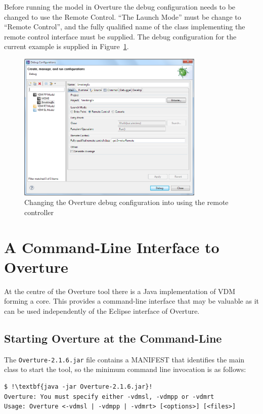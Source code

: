\documentclass{overturerepchap}
\begin{document}
Before running the model in Overture the debug configuration needs to be changed to use the Remote Control. ``The Launch Mode'' must be change to ``Remote Control'', and the fully qualified name of the class implementing the remote control interface must be supplied. The debug configuration for the current example is supplied in Figure~\ref{fig:gui:DebugConfiguration}.

\begin{figure}[h]
\begin{center}
  \includegraphics[width=3.5in]{figures/SmokersDebugConfig}
  \caption[labelInTOC]{Changing the Overture debug configuration into using the remote controller}
  \label{fig:gui:DebugConfiguration}
\end{center}
\end{figure}



\chapter{A Command-Line Interface to Overture}\label{sec:commandline}

At the centre of the Overture tool there is a Java implementation of VDM
forming a core. This provides a command-line interface that may be valuable
as it can be used independently of the Eclipse interface of Overture.

\section{Starting Overture at the Command-Line}

The \texttt{Overture-2.1.6.jar} file contains a MANIFEST that identifies the main class to start the
tool, so the minimum command line invocation is as follows:

\lstset{style=tool,language=}
\begin{lstlisting}
$ !\textbf{java -jar Overture-2.1.6.jar}!
Overture: You must specify either -vdmsl, -vdmpp or -vdmrt
Usage: Overture <-vdmsl | -vdmpp | -vdmrt> [<options>] [<files>]
\end{lstlisting}
\lstset{style=mystyle}
\lstset{language=VDM++}
\end{document}
